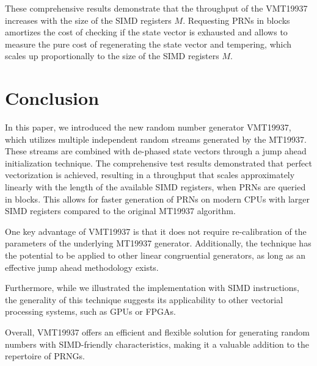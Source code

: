 \documentclass[preprint,1p,times]{elsarticle}
\begin{document}
			These comprehensive results demonstrate that the throughput of the VMT19937 increases with the size of the SIMD registers $M$. Requesting PRNs in blocks amortizes the cost of checking if the state vector is exhausted and allows to measure the pure cost of regenerating the state vector and tempering, which scales up proportionally to the size of the SIMD registers $M$.
			
			\section{Conclusion}
			In this paper, we introduced the new random number generator VMT19937, which utilizes multiple independent random streams generated by the MT19937. These streams are combined with de-phased state vectors through a jump ahead initialization technique. The comprehensive test results demonstrated that perfect vectorization is achieved, resulting in a throughput that scales approximately linearly with the length of the available SIMD registers, when PRNs are queried in blocks. This allows for faster generation of PRNs on modern CPUs with larger SIMD registers compared to the original MT19937 algorithm.
			
			One key advantage of VMT19937 is that it does not require re-calibration of the parameters of the underlying MT19937 generator. Additionally, the technique has the potential to be applied to other linear congruential generators, as long as an effective jump ahead methodology exists.
			
			Furthermore, while we illustrated the implementation with SIMD instructions, the generality of this technique suggests its applicability to other vectorial processing systems, such as GPUs or FPGAs.
			
			Overall, VMT19937 offers an efficient and flexible solution for generating random numbers with SIMD-friendly characteristics, making it a valuable addition to the repertoire of PRNGs.
			
\end{document}
